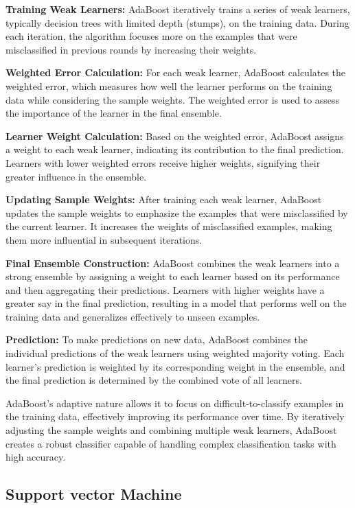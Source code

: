 \documentclass[preprint,aps,nofootinbib,a4paper,superscriptaddress,longbibliography,amsfonts,amssymb,amsmath,titlepage]{revtex4-2}
\begin{document}
\textbf{Training Weak Learners:} AdaBoost iteratively trains a series of weak learners, typically decision trees with limited depth (stumps), on the training data. During each iteration, the algorithm focuses more on the examples that were misclassified in previous rounds by increasing their weights.

\textbf{Weighted Error Calculation:} For each weak learner, AdaBoost calculates the weighted error, which measures how well the learner performs on the training data while considering the sample weights. The weighted error is used to assess the importance of the learner in the final ensemble.

\textbf{Learner Weight Calculation:} Based on the weighted error, AdaBoost assigns a weight to each weak learner, indicating its contribution to the final prediction. Learners with lower weighted errors receive higher weights, signifying their greater influence in the ensemble.

\textbf{Updating Sample Weights:} After training each weak learner, AdaBoost updates the sample weights to emphasize the examples that were misclassified by the current learner. It increases the weights of misclassified examples, making them more influential in subsequent iterations.

\textbf{Final Ensemble Construction:} AdaBoost combines the weak learners into a strong ensemble by assigning a weight to each learner based on its performance and then aggregating their predictions. Learners with higher weights have a greater say in the final prediction, resulting in a model that performs well on the training data and generalizes effectively to unseen examples.

\textbf{Prediction:} To make predictions on new data, AdaBoost combines the individual predictions of the weak learners using weighted majority voting. Each learner's prediction is weighted by its corresponding weight in the ensemble, and the final prediction is determined by the combined vote of all learners.

AdaBoost's adaptive nature allows it to focus on difficult-to-classify examples in the training data, effectively improving its performance over time. By iteratively adjusting the sample weights and combining multiple weak learners, AdaBoost creates a robust classifier capable of handling complex classification tasks with high accuracy.


\subsection{Support vector Machine}
\end{document}
